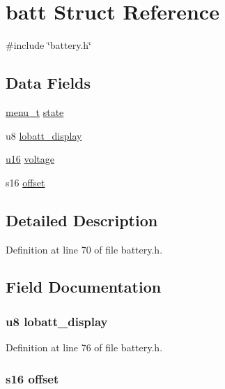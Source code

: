 \hypertarget{structbatt}{\section{batt \-Struct \-Reference}
\label{structbatt}
}


{\ttfamily \#include \char`\"{}battery.\-h\char`\"{}}

\subsection*{\-Data \-Fields}
\begin{DoxyCompactItemize}
\item 
\hyperlink{project_8h_a44455c5614c38dfadce594b2228fd055}{menu\-\_\-t} \hyperlink{structbatt_ac6b2518df4ca45cee089e61f152572b2}{state}
\item 
u8 \hyperlink{structbatt_a01593d72362c2d33a60b92c037f399ef}{lobatt\-\_\-display}
\item 
\hyperlink{main__ED__BM_8c_a9e6c91d77e24643b888dbd1a1a590054}{u16} \hyperlink{structbatt_ad769a752524b8ab13170d3e4940686de}{voltage}
\item 
s16 \hyperlink{structbatt_a0d9e2e9984f21129b2b54a114600b57b}{offset}
\end{DoxyCompactItemize}


\subsection{\-Detailed \-Description}


\-Definition at line 70 of file battery.\-h.



\subsection{\-Field \-Documentation}
\hypertarget{structbatt_a01593d72362c2d33a60b92c037f399ef}{
\subsubsection[{lobatt\-\_\-display}]{\setlength{\rightskip}{0pt plus 5cm}u8 {\bf lobatt\-\_\-display}}}\label{structbatt_a01593d72362c2d33a60b92c037f399ef}


\-Definition at line 76 of file battery.\-h.

\hypertarget{structbatt_a0d9e2e9984f21129b2b54a114600b57b}{
\subsubsection[{offset}]{\setlength{\rightskip}{0pt plus 5cm}s16 {\bf offset}}}\label{structbatt_a0d9e2e9984f21129b2b54a114600b57b}


